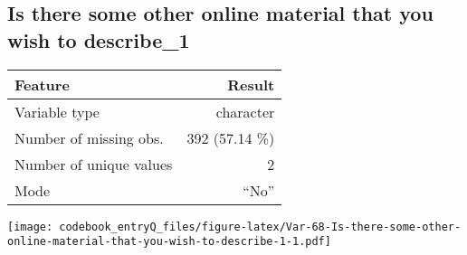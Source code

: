 \documentclass[]{article}
\newcommand{\fullline}{\noindent\makebox[\linewidth]{\rule{\textwidth}{0.4pt}}}
\newcommand{\bminione}{\begin{minipage}{0.75 \textwidth}}
\newcommand{\bminitwo}{\begin{minipage}{0.25 \textwidth}}
\newcommand{\emini}{\end{minipage}}
\begin{document}
\fullline

\hypertarget{is-there-some-other-online-material-that-you-wish-to-describe_1}{\subsection{Is
there some other online material that you wish to
describe\_1}\label{is-there-some-other-online-material-that-you-wish-to-describe_1}}

\bminione

\begin{longtable}[]{@{}lr@{}}
\toprule
\begin{minipage}[b]{0.34\columnwidth}\raggedright\strut
Feature\strut
\end{minipage} & \begin{minipage}[b]{0.20\columnwidth}\raggedleft\strut
Result\strut
\end{minipage}\tabularnewline
\midrule
\endhead
\begin{minipage}[t]{0.34\columnwidth}\raggedright\strut
Variable type\strut
\end{minipage} & \begin{minipage}[t]{0.20\columnwidth}\raggedleft\strut
character\strut
\end{minipage}\tabularnewline
\begin{minipage}[t]{0.34\columnwidth}\raggedright\strut
Number of missing obs.\strut
\end{minipage} & \begin{minipage}[t]{0.20\columnwidth}\raggedleft\strut
392 (57.14 \%)\strut
\end{minipage}\tabularnewline
\begin{minipage}[t]{0.34\columnwidth}\raggedright\strut
Number of unique values\strut
\end{minipage} & \begin{minipage}[t]{0.20\columnwidth}\raggedleft\strut
2\strut
\end{minipage}\tabularnewline
\begin{minipage}[t]{0.34\columnwidth}\raggedright\strut
Mode\strut
\end{minipage} & \begin{minipage}[t]{0.20\columnwidth}\raggedleft\strut
``No''\strut
\end{minipage}\tabularnewline
\bottomrule
\end{longtable}

\emini
\bminitwo
\texttt{[image: codebook\_entryQ\_files/figure-latex/Var-68-Is-there-some-other-online-material-that-you-wish-to-describe-1-1.pdf]}
\emini
\end{document}
